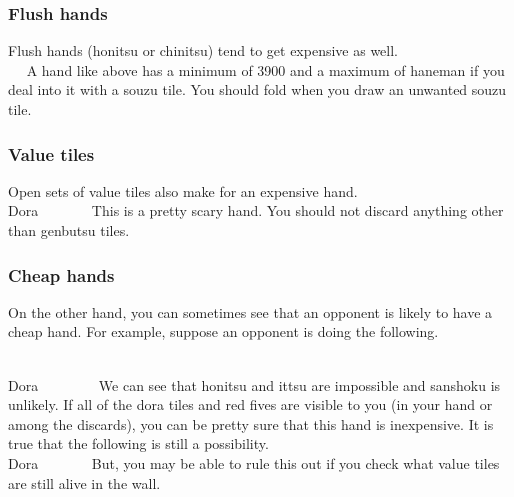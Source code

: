 {{\subsubsection*{Flush hands}

Flush hands ({\jap honitsu} or {\jap chinitsu}) tend to get expensive as well. 
\vspace{-20pt}
\bp
{}\\ \vspace{-16pt}
~\rfs~
\ep
A hand like above has a minimum of 3900 and a maximum of {\jap haneman} if you deal into it with a {\jap souzu} tile. You should fold when you draw an unwanted {\jap souzu} tile.

\subsubsection*{Value tiles}

Open sets of value tiles also make for an expensive hand. 
\bp
{}
\rbai\bai\bai~~\dong\dong\rdong~~\\
\hfill\footnotesize{{\jap Dora}~~~~~~~}
\ep
This is a pretty scary hand. You should not discard anything other than {\jap genbutsu} tiles. 

\bigskip
\subsubsection*{Cheap hands}

On the other hand, you can sometimes see that an opponent is likely to have a cheap hand. For example, suppose an opponent is doing the following. 

\bp
{}
~
~~\\
\hfill\footnotesize{{\jap Dora}~~~~~~~~}
\ep
We can see that {\jap honitsu} and {\jap ittsu} are impossible and {\jap sanshoku} is unlikely. If all of the {\jap dora} tiles and red fives are visible to you (in your hand or among the discards), you can be pretty sure that this hand is inexpensive. It is true that the following is still a possibility. 
\bp
\bai\bai\bai\fa\fa\fa\zhong~
~
~~\\
\hfill\footnotesize{{\jap Dora}~~~~~~~}
\ep
But, you may be able to rule this out if you check what value tiles are still alive in the wall. 

}}
